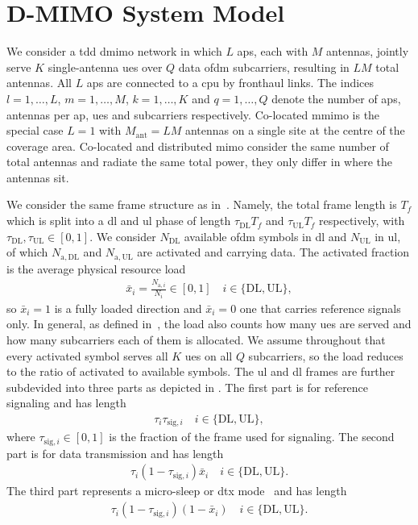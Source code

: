 \section{D-MIMO System Model}
\label{sec:sysmodel}

We consider a \gls{tdd} \gls{dmimo} network in which $L$ \glspl{ap}, each with
$M$ antennas, jointly serve $K$ single-antenna \glspl{ue} over $Q$ data
\gls{ofdm} subcarriers, resulting in $LM$ total antennas. All $L$ \glspl{ap} are connected to
a \gls{cpu} by fronthaul links. The indices $l=1,\dots,L$, $m=1,\dots,M$,
$k=1,\dots,K$ and $q=1,\dots,Q$ denote the number of \glspl{ap}, antennas per \gls{ap}, \glspl{ue} and subcarriers respectively. Co-located \gls{mmimo} is the special case
$L=1$ with $M_{\mathrm{ant}}=LM$ antennas on a single site at the centre of the
coverage area. Co-located and distributed \gls{mimo} consider the same number of total antennas and radiate the same total power, they only differ in where the antennas sit.


We consider the same frame structure as in~\cite{peschiera2026fr3}. Namely, the total frame length is $T_f$ which is split into a \gls{dl} and \gls{ul} phase of length $\tau_{\mathrm{DL}}T_f$ and $\tau_{\mathrm{UL}}T_f$ respectively, with $\tau_{\mathrm{DL}}, \tau_{\mathrm{UL}} \in [0,1]$. We consider $N_{\mathrm{DL}}$ available \gls{ofdm} symbols in \gls{dl} and $N_{\mathrm{UL}}$ in \gls{ul}, of which $N_{\mathrm{a, DL}}$ and $N_{\mathrm{a, UL}}$ are activated and carrying data. The activated fraction is the average physical resource load
\begin{align}
\label{eq:load}
\bar{x}_{i} = \frac{N_{\mathrm{a},i}}{N_{i}} \in [0,1] \quad i \in \{\mathrm{DL}, \mathrm{UL}\},
\end{align}
so $\bar{x}_{i}=1$ is a fully loaded direction and $\bar{x}_{i}=0$ one that carries reference signals only. In general, as defined in~\cite{peschiera2026fr3}, the load also counts how many \glspl{ue} are served and how many subcarriers each of them is allocated. We assume throughout that every activated symbol serves all $K$ \glspl{ue} on all $Q$ subcarriers, so the load reduces to the ratio of activated to available symbols. The \gls{ul} and \gls{dl} frames are further subdevided into three parts as depicted in . The first part is for reference signaling and has length
\begin{align}
    \tau_i \tau_{\mathrm{sig}, i} \quad i \in \{\mathrm{DL}, \mathrm{UL}\}, 
\end{align}
where $\tau_{\mathrm{sig}, i} \in [0,1]$ is the fraction of the frame used for signaling. The second part is for data transmission and has length
\begin{align}
\label{eq:frame_data}
    \tau_i (1 - \tau_{\mathrm{sig}, i}) \bar{x}_{i}\quad i \in \{\mathrm{DL}, \mathrm{UL}\}.
\end{align}
The third part represents a micro-sleep or \gls{dtx} mode~\cite{3GPP_TR38864} and has length
\begin{align}
   \tau_i (1 - \tau_{\mathrm{sig}, i})(1 - \bar{x}_{i})\quad i \in \{\mathrm{DL}, \mathrm{UL}\}.
\end{align}

